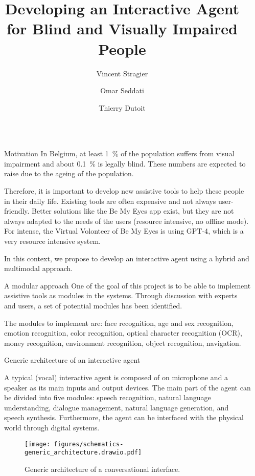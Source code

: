 \documentclass[final]{beamer}
\title{Developing an Interactive Agent for Blind and Visually Impaired People}
\author{Vincent Stragier \inst{1} \and Omar Seddati \inst{1} \and Thierry Dutoit \inst{1}}
\institute[shortinst]{\inst{1} Numediart Institute, ISIA Lab, Faculty of Engineering — University of Mons — Boulevard Dolez 31, 7000 Mons, Hainaut, Belgium}
\newlength{\sepwidth}
\newlength{\colwidth}
\newcommand{\separatorcolumn}{\begin{column}{\sepwidth}\end{column}}
\begin{document}
\begin{frame}[t]
  \begin{columns}[t]
    \separatorcolumn

    \begin{column}{\colwidth}

      \begin{block}{Motivation}
        In Belgium, at least 1~\% of the population suffers from visual impairment and about 0.1~\% is legally blind. These numbers are expected to raise due to the ageing of the population.

        Therefore, it is important to develop new assistive tools to help these people in their daily life. Existing tools are often expensive and not always user-friendly. Better solutions like the Be My Eyes\cite{IntroducingOurVirtual2023} app exist, but they are not always adapted to the needs of the users (resource intensive, no offline mode). For intense, the Virtual Volonteer of Be My Eyes is using GPT-4\cite{GPT42023}, which is a very resource intensive system.

        In this context, we propose to develop an interactive agent using a hybrid and multimodal approach.
      \end{block}

      \begin{block}{A modular approach}
        One of the goal of this project is to be able to implement assistive tools as modules in the systems. Through discussion with experts and users, a set of potential modules has been identified.

        The modules to implement are: face recognition, age and sex recognition, emotion recognition, color recognition, optical character recognition (OCR), money recognition, environment recognition, object recognition, navigation.
      \end{block}

      \begin{alertblock}{Generic architecture of an interactive agent}

        A typical (vocal) interactive agent is composed of on microphone and a speaker as its main inputs and output devices. The main part of the agent can be divided into five modules: speech recognition, natural language understanding, dialogue management, natural language generation, and speech synthesis. Furthermore, the agent can be interfaced with the physical world through digital systems.
        \begin{figure}[ht]
          \centering
          \texttt{[image: figures/schematics-generic\_architecture.drawio.pdf]}
          \caption{Generic architecture of a conversational interface\cite{lugrinHandbookSociallyInteractive2021}.\label{fig:architecture_conversational_interface}}
        \end{figure}


\end{alertblock}
\end{column}
\end{columns}
\end{frame}
\end{document}
